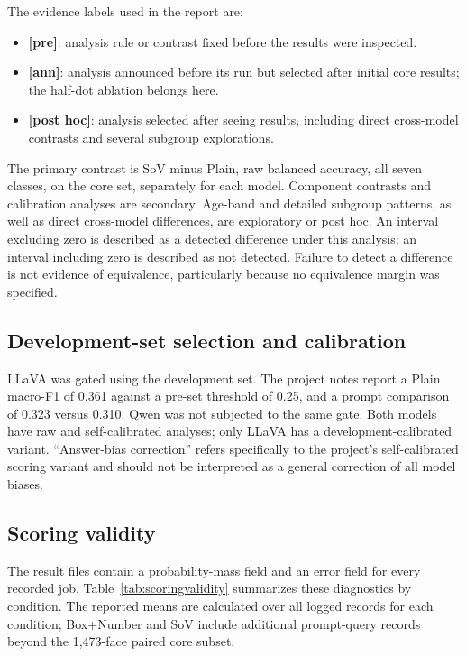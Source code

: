 \documentclass[lettersize,journal]{IEEEtran}
\begin{document}
The evidence labels used in the report are:
\begin{itemize}
    \item \textbf{[pre]}: analysis rule or contrast fixed before the results were inspected.
    \item \textbf{[ann]}: analysis announced before its run but selected after initial core results; the half-dot ablation belongs here.
    \item \textbf{[post hoc]}: analysis selected after seeing results, including direct cross-model contrasts and several subgroup explorations.
\end{itemize}
The primary contrast is SoV minus Plain, raw balanced accuracy, all seven classes, on the core set, separately for each model. Component contrasts and calibration analyses are secondary. Age-band and detailed subgroup patterns, as well as direct cross-model differences, are exploratory or post hoc. An interval excluding zero is described as a detected difference under this analysis; an interval including zero is described as not detected. Failure to detect a difference is not evidence of equivalence, particularly because no equivalence margin was specified.

\subsection{Development-set selection and calibration}
LLaVA was gated using the development set. The project notes report a Plain macro-F1 of 0.361 against a pre-set threshold of 0.25, and a prompt comparison of 0.323 versus 0.310. Qwen was not subjected to the same gate. Both models have raw and self-calibrated analyses; only LLaVA has a development-calibrated variant. ``Answer-bias correction'' refers specifically to the project's self-calibrated scoring variant and should not be interpreted as a general correction of all model biases.

\subsection{Scoring validity}
The result files contain a probability-mass field and an error field for every recorded job. Table~\ref{tab:scoringvalidity} summarizes these diagnostics by condition. The reported means are calculated over all logged records for each condition; Box+Number and SoV include additional prompt-query records beyond the 1,473-face paired core subset.
\end{document}
